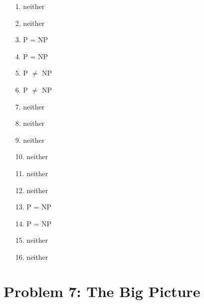 \documentclass[10pt,letter]{article}
\begin{document}
\begin{enumerate}
\item[1.] neither
\item[2.] neither
\item[3.] P = NP
\item[4.] P = NP
\item[5.] P $\neq$ NP
\item[6.] P $\neq$ NP
\item[7.] neither
\item[8.] neither
\item[9.] neither
\item[10.] neither
\item[11.] neither
\item[12.] neither
\item[13.] P = NP
\item[14.] P = NP
\item[15.] neither
\item[16.] neither
\end{enumerate}

\section*{Problem 7: The Big Picture}
\end{document}
